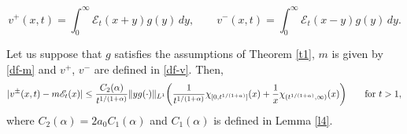 \documentclass[10pt,a4paper]{amsart}
\def\sE{{\mathscr{E}}}
\begin{document}
\begin{equation}\label{df-v}
v^+(x,t) = \int_0^\infty    \sE_t(x+y)g(y)\,dy,\qquad
v^-(x,t) = \int_0^\infty \sE_t(x-y) g(y)\,dy.
\end{equation}

\begin{lemma}\label{l5}
Let us suppose that $g$ satisfies the assumptions of Theorem \ref{t1}, $m$ is given by \eqref{df-m} and $v^+$, $v^-$ are defined in \eqref{df-v}. Then, 
$$
|v^\pm (x, t)  - m \sE_t(x)| \le \frac{C_2(\alpha)}{t^{1/(1+\alpha)}}\| y g(\cdot)\|_{L^1}\bigg(\frac1{t^{1/(1+\alpha)}}\chi_{[0, t^{1/(1+\alpha)}]}(x) + \frac 1x \chi_{(t^{1/(1+\alpha)}, \infty)}(x)\bigg)\qquad\hbox{for }t>1,
$$
where $C_2(\alpha) =2a_0 C_1(\alpha)$ and $C_1(\alpha)$ is defined in Lemma \ref{l4}.
\end{lemma}
\end{document}
